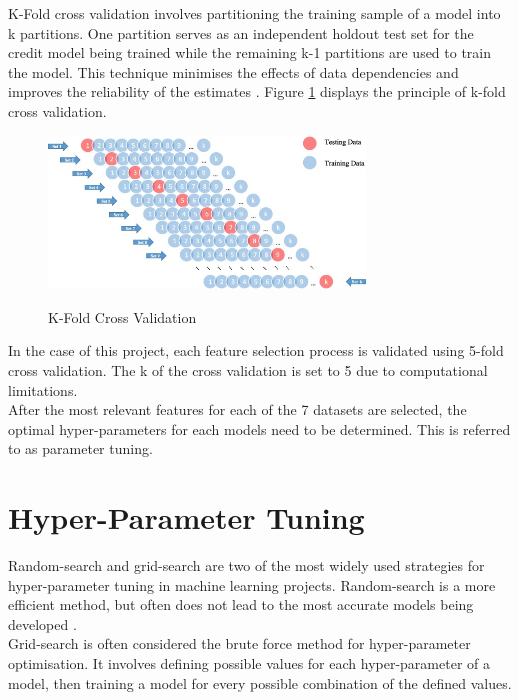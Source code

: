 K-Fold cross validation involves partitioning the training sample of a model into k partitions. One partition serves as an independent holdout test set for the credit model being trained while the remaining k-1 partitions are used to train the model. This technique minimises the effects of data dependencies and improves the reliability of the estimates \parencite{k_fold}. Figure \ref{fig:k_fold} displays the principle of k-fold cross validation. 

\vspace{10 pt}

\begin{figure}[!htb]
\centering
\includegraphics[width=0.75\textwidth]{images/k_fold.jpg}
\caption{K-Fold Cross Validation}
\label{fig:k_fold}
\parencite{k_fold}
\end{figure}

\vspace{10 pt}

In the case of this project, each feature selection process is validated using 5-fold cross validation. The k of the cross validation is set to 5 due to computational limitations. \\

After the most relevant features for each of the 7 datasets are selected, the optimal hyper-parameters for each models need to be determined. This is referred to as  parameter tuning. 

\section{Hyper-Parameter Tuning}

Random-search and grid-search are two of the most widely used strategies for hyper-parameter tuning in machine learning projects. Random-search is a more efficient method, but often does not lead to the most accurate models being developed \parencite{search1}. \\

Grid-search is often considered the brute force method for hyper-parameter optimisation. It involves defining possible values for each hyper-parameter of a model, then training a model for every possible combination of the defined values.  \\

